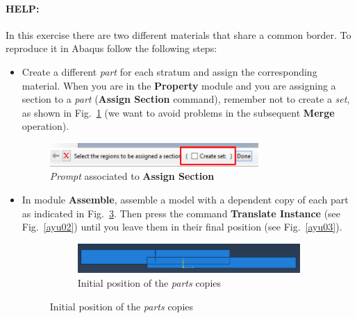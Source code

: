 \paragraph{HELP:} In this exercise there are two different materials
that share a common border. To reproduce it in Abaqus follow the
following steps:
\begin{itemize}
\item Create a different \textit{part} for each stratum and assign the
  corresponding material. When you are in the \textbf{Property} module
  and you are assigning a section to a \textit{part} (\textbf{Assign
    Section} command), remember not to create a \textit{set}, as shown
  in Fig.~\ref{corr01} (we want to avoid problems in the subsequent
  \textbf{Merge} operation).
  \begin{figure}[!h]
    \begin{center}
      \includegraphics[width=0.75\textwidth]{./body/images/corr01.pdf}
    \end{center}
    \caption{\textit{Prompt} associated to \textbf{Assign Section}}
    \label{corr01}
  \end{figure}
\item In module \textbf{Assemble}, assemble a model with a dependent
  copy of each part as indicated in Fig.~\ref{ayu01}. Then press the
  command \textbf{Translate Instance} (see Fig.~\ref{ayu02}) until you
  leave them in their final position (see Fig.~\ref{ayu03}).
  \begin{figure}[!h]
    \centering
    \begin{subfigure}[!h]{0.95\textwidth}
      \includegraphics[width=\textwidth]{./body/images/ayu01}
      \caption{Initial position of the \textit{parts} copies}
      \label{ayu01}
    \end{subfigure}%
    

\end{figure}
\end{itemize}
